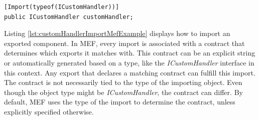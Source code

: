 \newpage
\begin{lstlisting}[style=CSharp, caption={ICustomHandler import for MEF example}, label={lst:customHandlerImportMefExample}]
[Import(typeof(ICustomHandler))]
public ICustomHandler customHandler;
\end{lstlisting}
Listing \ref{lst:customHandlerImportMefExample} displays how to import an exported component. In MEF, every import is associated with a contract that determines which exports it matches with. This contract can be an explicit string or automatically generated based on a type, like the \textit{ICustomHandler} interface in this context. Any export that declares a matching contract can fulfill this import. The contract is not necessarily tied to the type of the importing object. Even though the object type might be \textit{ICustomHandler}, the contract can differ. By default, MEF uses the type of the import to determine the contract, unless explicitly specified otherwise.
